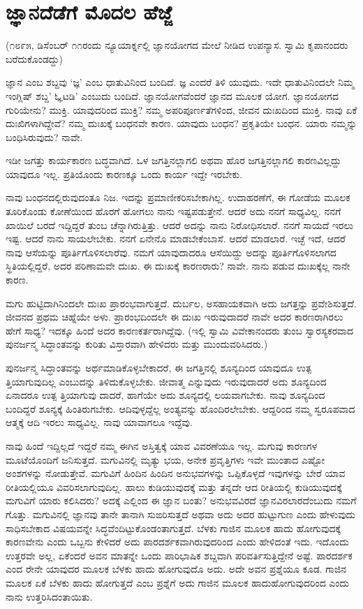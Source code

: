 
\chapter{ಜ್ಞಾನದೆಡೆಗೆ ಮೊದಲ ಹೆಜ್ಜೆ}

(೧೮೯೫, ಡಿಸೆಂಬರ್ ೧೧ರಂದು ನ್ಯೂಯಾರ್ಕ್ನಲ್ಲಿ ಜ್ಞಾನಯೋಗದ ಮೇಲೆ ನೀಡಿದ ಉಪನ್ಯಾಸ. ಸ್ವಾಮಿ ಕೃಪಾನಂದರು ಬರೆದುಕೊಂಡದ್ದು)

ಜ್ಞಾನ ಎಂಬ ಶಬ್ದವು ‘ಜ್ಞ’ ಎಂಬ ಧಾತುವಿನಿಂದ ಬಂದಿದೆ. ಜ್ಞ ಎಂದರೆ ತಿಳಿ ಯುವುದು. ಇದೇ ಧಾತುವಿನಿಂದಲೇ ನಿಮ್ಮ ಇಂಗ್ಲಿಷ್ ಶಬ್ದ’ ಓ್ಞಟಡಿ’ ಎಂಬುದು ಬಂದಿದೆ. ಜ್ಞಾನಯೋಗವೆಂದರೆ ಜ್ಞಾನದ ಮೂಲಕ ಯೋಗ. ಜ್ಞಾನಯೋಗದ ಗುರಿಯೇನು? ಮುಕ್ತಿ. ಯಾವುದರಿಂದ ಮುಕ್ತಿ? ನಮ್ಮ ಅಪರಿಪೂರ್ಣತೆಗಳಿಂದ, ಜೀವನ ದುಃಖದಿಂದ ಮುಕ್ತಿ. ನಾವು ಏಕೆ ದುಃಖಿಗಳಾಗಿದ್ದೇವೆ? ನಮ್ಮ ದುಃಖಕ್ಕೆ ಬಂಧನವೇ ಕಾರಣ. ಯಾವುದು ಬಂಧನ? ಪ್ರಕೃತಿಯೇ ಬಂಧನ. ಯಾರು ನಮ್ಮನ್ನು ಬಂಧಿಸಿರುವುದು? ನಾವೇ.

ಇಡೀ ಜಗತ್ತು ಕಾರ್ಯಕಾರಣ ಬದ್ಧವಾಗಿದೆ. ಒಳ ಜಗತ್ತಿನಲ್ಲಾಗಲಿ ಅಥವಾ ಹೊರ ಜಗತ್ತಿನಲ್ಲಾಗಲಿ ಕಾರಣವಿಲ್ಲದ್ದು ಯಾವುದೂ ಇಲ್ಲ. ಪ್ರತಿಯೊಂದು ಕಾರಣಕ್ಕೂ ಒಂದು ಕಾರ್ಯ ಇದ್ದೇ ಇರಬೇಕು.

ನಾವು ಬಂಧನದಲ್ಲಿರುವುದಂತೂ ನಿಜ. ಇದನ್ನು ಪ್ರಮಾಣೀಕರಿಸಬೇಕಾಗಿಲ್ಲ. ಉದಾಹರಣೆಗೆ, ಈ ಗೋಡೆಯ ಮೂಲಕ ತೂರಿಕೊಂಡು ಕೋಣೆಯಿಂದ ಹೊರಗೆ ಹೋಗಲು ನಾನು ಇಷ್ಟಪಡುತ್ತೇನೆ. ಆದರೆ ಅದು ನನಗೆ ಸಾಧ್ಯವಿಲ್ಲ. ನನಗೆ ಖಾಯಿಲೆ ಬರದೆ ಇದ್ದಿದ್ದರೆ ತುಂಬ ಚೆನ್ನಾಗಿರುತ್ತಿತ್ತು. ಆದರೆ ಅದನ್ನು ನಾನು ನಿರೋಧಿಸಲಾರೆ. ನನಗೆ ಸಾಯದೆ ಇರಲು ಇಷ್ಟ. ಆದರೆ ನಾನು ಸಾಯಲೇಬೇಕು. ನನಗೆ ಏನೇನೊ ಮಾಡಬೇಕೆಂಬಾಸೆ. ಆದರೆ ಮಾಡಲಾರೆ. ಇಚ್ಛೆ ಇದೆ, ಆದರೆ ನಾವು ಆಸೆಯನ್ನು ಪೂರ್ತಿಗೊಳಿಸಲಾರೆವು. ನಮಗೆ ಯಾವುದಾದರೂ ಆಸೆಯಿದ್ದು ಅದನ್ನು ಪೂರ್ತಿಗೊಳಿಸಲಾಗದ ಸ್ಥಿತಿಯಲ್ಲಿದ್ದರೆ, ಅದರ ಪರಿಣಾಮವೇ ದುಃಖ. ಈ ದುಃಖಕ್ಕೆ ಕಾರಣರಾರು? ನಾವೇ. ನಾನು ಪಡುವ ದುಃಖಕ್ಕೆಲ್ಲ ನಾನೇ ಕಾರಣ.

ಮಗು ಹುಟ್ಟಿದಾಗಿನಿಂದಲೇ ದುಃಖ ಪ್ರಾರಂಭವಾಗುತ್ತದೆ. ದುರ್ಬಲ, ಅಸಹಾಯಕವಾಗಿ ಅದು ಜಗತ್ತನ್ನು ಪ್ರವೇಶಿಸುತ್ತದೆ. ಜೀವನದ ಪ್ರಥಮ ಚಿಹ್ನೆಯೇ ಅಳು. ಪ್ರಾರಂಭದಿಂದಲೇ ಈ ದುಃಖ ಇರುವುದಾದರೆ ನಾವೇ ಅದರ ಕಾರಣರಾಗಿರಲು ಹೇಗೆ ಸಾಧ್ಯ? ಇದಕ್ಕೂ ಹಿಂದೆ ಅದರ ಕಾರಣಕರ್ತರಾಗಿದ್ದೆವು. (ಇಲ್ಲಿ ಸ್ವಾಮಿ ವಿವೇಕಾನಂದರು ತುಂಬ ಸ್ವಾರಸ್ಯಕರವಾದ ಪುನರ್ಜನ್ಮ ಸಿದ್ಧಾಂತವನ್ನು ಕುರಿತು ವಿಸ್ತಾರವಾಗಿ ಹೇಳಿದರು ಮತ್ತು ಮುಂದುವರಿಸಿದರು.)

ಪುನರ್ಜನ್ಮ ಸಿದ್ಧಾಂತವನ್ನು ಅರ್ಥಮಾಡಿಕೊಳ್ಳಬೇಕಾದರೆ, ಈ ಜಗತ್ತಿನಲ್ಲಿ ಶೂನ್ಯದಿಂದ ಯಾವುದೂ ಉತ್ಪ ತ್ತಿಯಾಗುವುದಿಲ್ಲ ಎಂಬುದನ್ನು ತಿಳಿದುಕೊಳ್ಳಬೇಕು. ಜೀವಾತ್ಮ ಎನ್ನುವುದು ಇರುವುದಾದರೆ ಅದು ಶೂನ್ಯದಿಂದ ಏನಾದರೂ ಉತ್ಪ ತ್ತಿಯಾಗುವು ದಾದರೆ, ಹಾಗೆಯೇ ಅದು ಶೂನ್ಯದಲ್ಲಿ ಲಯವಾಗಬೇಕು. ನಾವು ಶೂನ್ಯದಿಂದ ಬಂದಿದ್ದರೆ ಶೂನ್ಯಕ್ಕೆ ಹಿಂತಿರುಗಬೇಕು. ಆದಿವುಳ್ಳದ್ದೆಲ್ಲ ಅಂತ್ಯವನ್ನು ಹೊಂದಿರಲೇಬೇಕು. ಆದ್ದರಿಂದ ನಮ್ಮ ಸ್ವರೂಪವಾದ ಆತ್ಮಕ್ಕೆ ಆದಿ ಇರಲು ಸಾಧ್ಯವಿಲ್ಲ. ನಾವು ಯಾವಾಗಲೂ ಇದ್ದೆವು.

ನಾವು ಹಿಂದೆ ಇದ್ದಿಲ್ಲದೆ ಇದ್ದರೆ ನಮ್ಮ ಈಗಿನ ಅಸ್ತಿತ್ವಕ್ಕೆ ಯಾವ ವಿವರಣೆಯೂ ಇಲ್ಲ. ಮಗುವು ಕಾರಣಗಳ ಮೂಟೆಯೊಂದಿಗೆ ಜನಿಸುತ್ತದೆ. ಮಗುವಿನಲ್ಲಿ ಮೃತ್ಯು ಭಯ, ಅನೇಕ ಪ್ರವೃತ್ತಿಗಳು ಇವೇ ಮುಂತಾದ ಎಷ್ಟೋ ಅಂಶಗಳನ್ನು ನೋಡುತ್ತೇವೆ. ಮಗುವಿಗೆ ಹಿಂದಿನ ಹಿಂದಿನ ಅನುಭವಗಳನ್ನು ಒಪ್ಪಿಕೊಳ್ಳದೆ ಇವುಗಳನ್ನು ಬೇರೆ ಯಾವ ರೀತಿಯಲ್ಲಿಯೂ ವಿವರಿಸಲಾಗುವುದಿಲ್ಲ. ಹಾಲು ಕುಡಿಯುವುದಕ್ಕೆ ಮತ್ತು ತನ್ನದೇ ಆದ ರೀತಿಯಲ್ಲಿ ಕುಡಿಯುವುದಕ್ಕೆ ಮಗುವಿಗೆ ಯಾರು ಕಲಿಸಿದರು? ಅದಕ್ಕೆ ಎಲ್ಲಿಂದ ಈ ಜ್ಞಾನ ಬಂತು? ಅನುಭವವಿರದೆ ಜ್ಞಾನವಿರಲಾರದೆಂಬುದು ನಮಗೆ ಗೊತ್ತು. ಮಗುವಿನಲ್ಲಿ ಜ್ಞಾನವು ತಾನೇ ತಾನಾಗಿ ಸುಙರಿಸುತ್ತದೆ ಅಥವಾ ಅದು ಅದರ ಹುಟ್ಟುಗುಣ ಎಂದು ಹೇಳುವುದು ಸಾಧಿಸಬೇಕಾದ ವಿಷಯವನ್ನೇ ಸಿದ್ಧವೆಂದಿಟ್ಟುಕೊಂಡಂತಾಗುತ್ತದೆ.  ಬೆಳಕು ಗಾಜಿನ ಮೂಲಕ ಹಾದು ಹೋಗುವುದಕ್ಕೆ ಕಾರಣವೇನು ಎಂದು ಒಬ್ಬನು ಕೇಳಿದರೆ ಅದು ಪಾರದರ್ಶಕವಾಗಿರುವುದರಿಂದ ಎಂದು ಹೇಳಿದಂತೆ ಇದು. ಇದೊಂದು ಉತ್ತರವೇ ಅಲ್ಲ, ಏಕೆಂದರೆ ಅವನ ಮಾತನ್ನೇ ಒಂದು ಪಾರಿಭಾಷಿಕ ಶಬ್ದವಾಗಿ ಪರಿವರ್ತಿಸುತ್ತಿದ್ದೇನೆ ಅಷ್ಟೆ. ಪಾರದರ್ಶಕ ಎಂದ ರೇನೇ ಯಾವುದರ ಮೂಲಕ ಬೆಳಕು ಹಾದು ಹೋಗುವುದೊ ಅದು. ಅದೇ ಅವನ ಪ್ರಶ್ನೆಯೂ ಕೂಡ. ಗಾಜಿನ ಮೂಲಕ ಏಕೆ ಬೆಳಕು ಹಾದು ಹೋಗುತ್ತದೆ ಎಂಬ ಪ್ರಶ್ನೆಗೆ ಅದು ಗಾಜಿನ ಮೂಲಕ ಹಾದುಹೋಗುವುದರಿಂದ ಎಂದು ನಾನು ಉತ್ತರಿಸಿದಂತಾಯಿತು.

